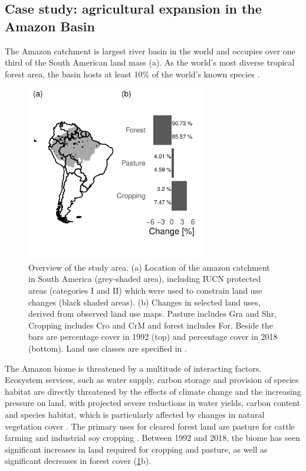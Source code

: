 \documentclass[titlesmallcaps,copyrightpage]{uomthesis}\usepackage[]{graphicx}\usepackage[]{color}
\begin{document}
\subsection{Case study: agricultural expansion in the Amazon
Basin}

The Amazon catchment is largest river basin in the world and occupies
over one third of the South American land mass (a). As the world's most diverse tropical forest area,
the basin hosts at least 10\% of the world's known species
\citep{da_silva_fate_2005}.

\begin{figure}[htb]
\centering
\includegraphics[width=3.11in]{chapters/figures/chapter3/fig2.pdf} 
\caption{Overview of the study area. (a) Location of the amazon catchment in South America (grey-shaded area), including IUCN protected areas (categories I and II) which were used to constrain land use changes (black shaded areas). (b) Changes in selected land uses, derived from observed land use maps. Pasture includes Gra and Shr, Cropping includes Cro and CrM and forest includes For. Beside the bars are percentage cover in 1992 (top) and percentage cover in 2018 (bottom). Land use classes are specified in .}
\label{ch3:fig2}
\end{figure}

The Amazon biome is threatened by a multitude of interacting factors.
Ecosystem services, such as water supply, carbon storage and provision
of species habitat are directly threatened by the effects of climate
change and the increasing pressure on land, with projected severe
reductions in water yields, carbon content and species habitat, which is
particularly affected by changes in natural vegetation cover
\citep{prussmann_vulnerability_2016}. The primary uses for cleared
forest land are pasture for cattle farming and industrial soy cropping
\citep{nepstad_slowing_2014, fao_aquastat_2015}. Between 1992 and 2018,
the biome has seen significant increases in land required for cropping
and pasture, as well as significant decreases in forest cover (\ref{ch3:fig2}b).
\end{document}
